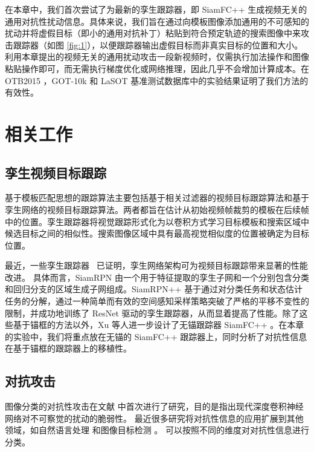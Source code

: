 在本章中，我们首次尝试了为最新的孪生跟踪器，即 SiamFC++ \cite{SiamFC++} 生成视频无关的通用对抗性扰动信息。具体来说，我们旨在通过向模板图像添加通用的不可感知的扰动并将虚假目标（即小的通用对抗补丁）粘贴到符合预定轨迹的搜索图像中来攻击跟踪器（如图 \ref{fig:1}），以便跟踪器输出虚假目标而非真实目标的位置和大小。利用本章提出的视频无关的通用扰动攻击一段新视频时，仅需执行加法操作和图像粘贴操作即可，而无需执行梯度优化或网络推理，因此几乎不会增加计算成本。在 OTB2015 \cite{OTB}，GOT-10k \cite{GOT-10k} 和 LaSOT \cite{LaSOT} 基准测试数据库中的实验结果证明了我们方法的有效性。

\section{相关工作}

\subsection{孪生视频目标跟踪}

基于模板匹配思想的跟踪算法主要包括基于相关过滤器的视频目标跟踪算法和基于孪生网络的视频目标跟踪算法。两者都旨在估计从初始视频帧裁剪的模板在后续帧中的位置。孪生跟踪器将视觉跟踪形式化为以卷积方式学习目标模板和搜索区域中候选目标之间的相似性。搜索图像区域中具有最高视觉相似度的位置被确定为目标位置。

最近，一些孪生跟踪器~\cite{SiamRPN,SiamRPN++,SiamFC++} 已证明，孪生网络架构可为视频目标跟踪带来显著的性能改进。
具体而言，SiamRPN \cite{SiamRPN} 由一个用于特征提取的孪生子网和一个分别包含分类和回归分支的区域生成子网组成。SiamRPN++ \cite{SiamRPN++} 基于通过对分类任务和状态估计任务的分解，通过一种简单而有效的空间感知采样策略突破了严格的平移不变性的限制，并成功地训练了 ResNet 驱动的孪生跟踪器，从而显着提高了性能。除了这些基于锚框的方法以外，Xu 等人进一步设计了无锚跟踪器 SiamFC++ \cite{SiamFC++}。在本章的实验中，我们将重点放在无锚的 SiamFC++ 跟踪器上，同时分析了对抗性信息在基于锚框的跟踪器上的移植性。

\subsection{对抗攻击}

图像分类的对抗性攻击在文献 \cite{intriguing} 中首次进行了研究，目的是指出现代深度卷积神经网络对不可察觉的扰动的脆弱性。
最近很多研究将对抗性信息的应用扩展到其他领域，如自然语言处理 \cite{generating} 和图像目标检测 \cite{wei2019transferable}。
可以按照不同的维度对对抗性信息进行分类。

